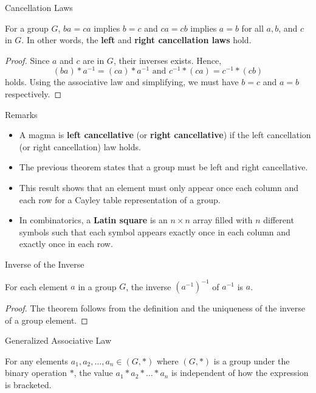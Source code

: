 \documentclass{beamer}
\begin{document}
\begin{frame}{Cancellation Laws}
\begin{theorem}
\justifying
For a group $G$, $ba = ca$ implies $b = c$ and $ca = cb$ implies $a = b$ for all $a, b$, and $c$ in $G$. In other words, the \textbf{left} and \textbf{right cancellation laws} hold.
\end{theorem}
\pause
\begin{proof}
\justifying
Since $a$ and $c$ are in $G$, their inverses exists. Hence, $$(ba)*a^{-1} = (ca)*a^{-1} \text{ and } c^{-1}*(ca) = c^{-1}*(cb)$$ holds. Using the associative law and simplifying, we must have $b = c$ and $a = b$ respectively.
\end{proof}
\end{frame}

\begin{frame}{Remarks}
\begin{itemize}
\justifying
\item A magma is \textbf{left cancellative} (or \textbf{right cancellative}) if the left cancellation (or right cancellation) law holds.
\item The previous theorem states that a group must be left and right cancellative.
\item This result shows that an element must only appear once each column and each row for a Cayley table representation of a group.
\item In combinatorics, a \textbf{Latin square} is an $n \times n$ array filled with $n$ different symbols such that each symbol appears exactly once in each column and exactly once in each row.
\end{itemize}
\end{frame}

\begin{frame}{Inverse of the Inverse}
\begin{theorem}
For each element $a$ in a group $G$, the inverse $\left(a^{-1}\right)^{-1}$ of $a^{-1}$ is $a$.
\end{theorem}        
\pause
\begin{proof}
\justifying
The theorem follows from the definition and the uniqueness of the inverse of a group element. 
\end{proof}
\end{frame}

\begin{frame}{Generalized Associative Law}
\begin{theorem}
\justifying
For any elements $a_1, a_2, \dots, a_n \in (G, *)$ where $(G, *)$ is a group under the binary operation $*$, the value $a_1 * a_2 * \dots * a_n$ is independent of how the expression is bracketed.
\end{theorem}
\end{frame}
\end{document}
